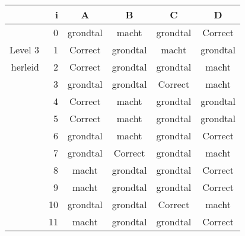 \begin{tabular}{ rr| c|c|c|c}\hline\hline
     & i & \textbf{A} & \textbf{B} & \textbf{C} & \textbf{D}\\\hline

&0&grondtal&macht&grondtal&Correct\cellcolor[gray]{0.6}\\
Level 3 & 1&Correct\cellcolor[gray]{0.6}&grondtal&macht&grondtal\\
herleid &2&Correct\cellcolor[gray]{0.6}&grondtal&grondtal&macht\\
&3&grondtal&grondtal&Correct\cellcolor[gray]{0.6}&macht\\
&4&Correct\cellcolor[gray]{0.6}&macht&grondtal&grondtal\\
&5&Correct\cellcolor[gray]{0.6}&macht&grondtal&grondtal\\
&6&grondtal&macht&grondtal&Correct\cellcolor[gray]{0.6}\\
&7&grondtal&Correct\cellcolor[gray]{0.6}&grondtal&macht\\
&8&macht&grondtal&grondtal&Correct\cellcolor[gray]{0.6}\\
&9&macht&grondtal&grondtal&Correct\cellcolor[gray]{0.6}\\
&10&grondtal&grondtal&Correct\cellcolor[gray]{0.6}&macht\\
&11&macht&grondtal&grondtal&Correct\cellcolor[gray]{0.6}\\
\hline\end{tabular}\par\ \newline

